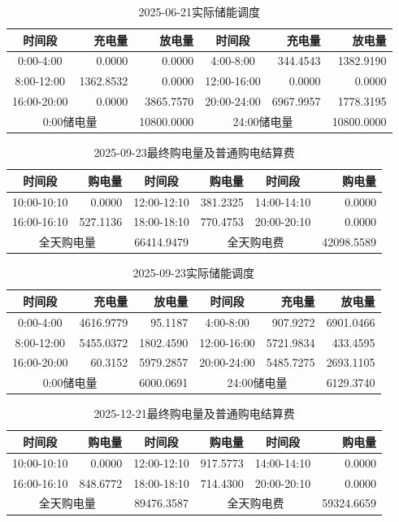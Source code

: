 \begin{table}[htbp]\centering
\caption{2025-06-21实际储能调度}
\begin{tabular}{|c|r|r|c|r|r|}\hline
时间段 & 充电量 & 放电量 & 时间段 & 充电量 & 放电量 \\ \hline
0:00-4:00 & 0.0000 & 0.0000 & 4:00-8:00 & 344.4543 & 1382.9190 \\ \hline
8:00-12:00 & 1362.8532 & 0.0000 & 12:00-16:00 & 0.0000 & 0.0000 \\ \hline
16:00-20:00 & 0.0000 & 3865.7570 & 20:00-24:00 & 6967.9957 & 1778.3195 \\ \hline
\multicolumn{2}{|c|}{0:00储电量} & 10800.0000 & \multicolumn{2}{c|}{24:00储电量} & 10800.0000 \\ \hline
\end{tabular}\end{table}
\begin{table}[htbp]\centering
\caption{2025-09-23最终购电量及普通购电结算费}
\begin{tabular}{|c|r|c|r|c|r|}\hline
时间段 & 购电量 & 时间段 & 购电量 & 时间段 & 购电量 \\ \hline
10:00-10:10 & 0.0000 & 12:00-12:10 & 381.2325 & 14:00-14:10 & 0.0000 \\ \hline
16:00-16:10 & 527.1136 & 18:00-18:10 & 770.4753 & 20:00-20:10 & 0.0000 \\ \hline
\multicolumn{2}{|c|}{全天购电量} & 66414.9479 & \multicolumn{2}{c|}{全天购电费} & 42098.5589 \\ \hline
\end{tabular}\end{table}
\begin{table}[htbp]\centering
\caption{2025-09-23实际储能调度}
\begin{tabular}{|c|r|r|c|r|r|}\hline
时间段 & 充电量 & 放电量 & 时间段 & 充电量 & 放电量 \\ \hline
0:00-4:00 & 4616.9779 & 95.1187 & 4:00-8:00 & 907.9272 & 6901.0466 \\ \hline
8:00-12:00 & 5455.0372 & 1802.4590 & 12:00-16:00 & 5721.9834 & 433.4595 \\ \hline
16:00-20:00 & 60.3152 & 5979.2857 & 20:00-24:00 & 5485.7275 & 2693.1105 \\ \hline
\multicolumn{2}{|c|}{0:00储电量} & 6000.0691 & \multicolumn{2}{c|}{24:00储电量} & 6129.3740 \\ \hline
\end{tabular}\end{table}
\begin{table}[htbp]\centering
\caption{2025-12-21最终购电量及普通购电结算费}
\begin{tabular}{|c|r|c|r|c|r|}\hline
时间段 & 购电量 & 时间段 & 购电量 & 时间段 & 购电量 \\ \hline
10:00-10:10 & 0.0000 & 12:00-12:10 & 917.5773 & 14:00-14:10 & 0.0000 \\ \hline
16:00-16:10 & 848.6772 & 18:00-18:10 & 714.4300 & 20:00-20:10 & 0.0000 \\ \hline
\multicolumn{2}{|c|}{全天购电量} & 89476.3587 & \multicolumn{2}{c|}{全天购电费} & 59324.6659 \\ \hline
\end{tabular}\end{table}
